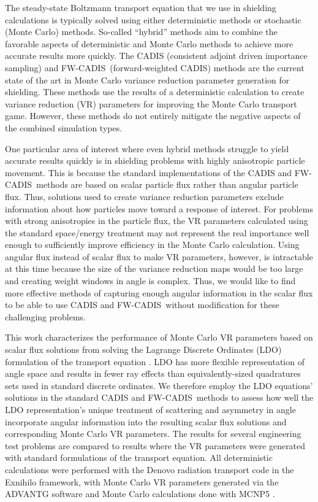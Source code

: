 \documentclass{article} %
\newcommand{\fwc}{\mbox{FW-CADIS}}
\begin{document}
The steady-state Boltzmann transport equation that we use in shielding
calculations is typically solved using either deterministic methods or
stochastic (Monte Carlo) methods. So-called ``hybrid'' methods aim to combine
the favorable aspects of deterministic and Monte Carlo methods to achieve more
accurate results more quickly. The CADIS (consistent adjoint driven importance
sampling) \cite{cadis} and \fwc\ (forward-weighted CADIS) \cite{fwcadis}
methods are the current state of the art in Monte Carlo variance reduction
parameter generation for shielding. These methods use the results of a
deterministic calculation to create variance reduction (VR) parameters for
improving the Monte Carlo transport game. However, these methods do not
entirely mitigate the negative aspects of the combined simulation types.

One particular area of interest where even hybrid methods struggle to yield
accurate results quickly is in shielding problems with highly anisotropic
particle movement. This is because the standard implementations of the CADIS
and \fwc\ methods are based on scalar particle flux rather than angular
particle flux. Thus, solutions used to create variance reduction parameters
exclude information about how particles move toward a response of interest.
For problems with strong anisotropies in the particle flux, the VR parameters
calculated using the standard space/energy treatment may not represent the
real importance well enough to sufficiently improve efficiency in the Monte
Carlo calculation. Using angular flux instead of scalar flux to make VR parameters, however, is intractable at this time because the size of the variance reduction maps would be too large and creating weight windows in angle is complex. Thus, we would like to find more effective methods of capturing enough angular information in the scalar flux to be able to use CADIS and \fwc\ without modification for these challenging problems. 

This work characterizes the performance of Monte Carlo VR
parameters based on scalar flux solutions from solving the Lagrange Discrete
Ordinates (LDO) formulation of the transport equation \cite{ahrens}. LDO has more flexible representation of angle space and results in fewer ray effects than equivalently-sized quadratures sets used in standard discrete ordinates. We therefore employ
the LDO equations' solutions in the standard CADIS and \fwc\ methods to assess
how well the LDO representation's unique treatment of scattering and asymmetry
in angle incorporate angular information into the resulting scalar flux
solutions and corresponding Monte Carlo VR parameters. The results for
several engineering test problems are compared to results where the VR parameters
were generated with standard formulations of the transport equation. All
deterministic calculations were performed with the Denovo radiation transport
code \cite{denovo} in the Exnihilo framework, with Monte Carlo VR
parameters generated via the ADVANTG software \cite{advantg} and Monte Carlo
calculations done with MCNP5 \cite{mcnp}.
\end{document}
